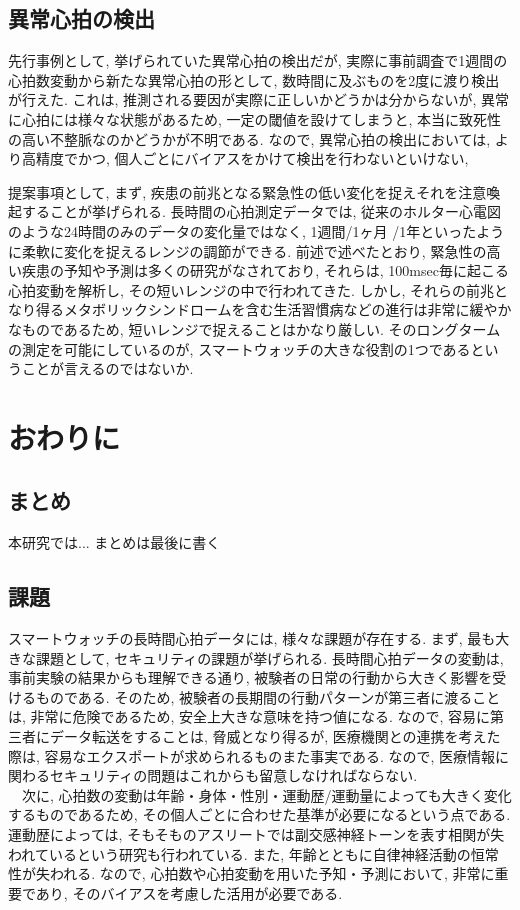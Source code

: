 \documentclass[report, 11pt, a4paper]{jsbook}
\begin{document}
\section{異常心拍の検出}
先行事例として, 挙げられていた異常心拍の検出だが, 実際に事前調査で1週間の心拍数変動から新たな異常心拍の形として, 数時間に及ぶものを2度に渡り検出が行えた. 
これは, 推測される要因が実際に正しいかどうかは分からないが, 異常に心拍には様々な状態があるため, 一定の閾値を設けてしまうと, 本当に致死性の高い不整脈なのかどうかが不明である. なので, 異常心拍の検出においては, より高精度でかつ, 個人ごとにバイアスをかけて検出を行わないといけない,

提案事項として, まず, 疾患の前兆となる緊急性の低い変化を捉えそれを注意喚起することが挙げられる. 長時間の心拍測定データでは, 従来のホルター心電図のような24時間のみのデータの変化量ではなく, 1週間/1ヶ月 /1年といったように柔軟に変化を捉えるレンジの調節ができる. 前述で述べたとおり, 緊急性の高い疾患の予知や予測は多くの研究がなされており, それらは, 100msec毎に起こる心拍変動を解析し, その短いレンジの中で行われてきた. しかし, それらの前兆となり得るメタボリックシンドロームを含む生活習慣病などの進行は非常に緩やかなものであるため, 短いレンジで捉えることはかなり厳しい. そのロングタームの測定を可能にしているのが, スマートウォッチの大きな役割の1つであるということが言えるのではないか.\\  


\chapter{おわりに}

\section{まとめ}
本研究では...
まとめは最後に書く

\section{課題}
スマートウォッチの長時間心拍データには, 様々な課題が存在する. まず, 最も大きな課題として, セキュリティの課題が挙げられる. 長時間心拍データの変動は, 事前実験の結果からも理解できる通り, 被験者の日常の行動から大きく影響を受けるものである. そのため, 被験者の長期間の行動パターンが第三者に渡ることは, 非常に危険であるため, 安全上大きな意味を持つ値になる. なので, 容易に第三者にデータ転送をすることは, 脅威となり得るが, 医療機関との連携を考えた際は, 容易なエクスポートが求められるものまた事実である. なので, 医療情報に関わるセキュリティの問題はこれからも留意しなければならない. \\
　次に, 心拍数の変動は年齢・身体・性別・運動歴/運動量によっても大きく変化するものであるため, その個人ごとに合わせた基準が必要になるという点である. 運動歴によっては, そもそものアスリートでは副交感神経トーンを表す相関が失われているという研究も行われている. また, 年齢とともに自律神経活動の恒常性が失われる. なので, 心拍数や心拍変動を用いた予知・予測において, 非常に重要であり, そのバイアスを考慮した活用が必要である.
\end{document}

